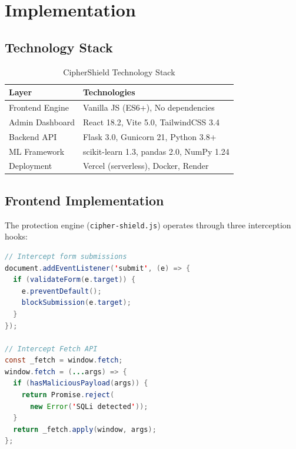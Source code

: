 \documentclass[10pt, twocolumn]{article}
\begin{document}
\section{Implementation}
\label{sec:impl}

\subsection{Technology Stack}

\begin{table}[H]
\centering
\caption{CipherShield Technology Stack}
\label{tab:stack}
\small
\begin{tabular}{ll}
\toprule
\textbf{Layer} & \textbf{Technologies} \\
\midrule
Frontend Engine  & Vanilla JS (ES6+), No dependencies \\
Admin Dashboard  & React 18.2, Vite 5.0, TailwindCSS 3.4 \\
Backend API      & Flask 3.0, Gunicorn 21, Python 3.8+ \\
ML Framework     & scikit-learn 1.3, pandas 2.0, NumPy 1.24 \\
Deployment       & Vercel (serverless), Docker, Render \\
\bottomrule
\end{tabular}
\end{table}

\subsection{Frontend Implementation}

The protection engine (\texttt{cipher-shield.js}) operates through 
three interception hooks:

\begin{lstlisting}[language=Java, caption={Core input interception (JavaScript)}]
// Intercept form submissions
document.addEventListener('submit', (e) => {
  if (validateForm(e.target)) {
    e.preventDefault();
    blockSubmission(e.target);
  }
});

// Intercept Fetch API
const _fetch = window.fetch;
window.fetch = (...args) => {
  if (hasMaliciousPayload(args)) {
    return Promise.reject(
      new Error('SQLi detected'));
  }
  return _fetch.apply(window, args);
};
\end{lstlisting}
\end{document}
